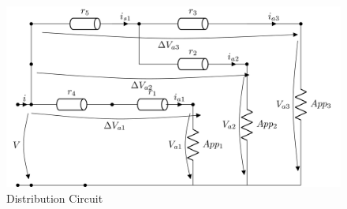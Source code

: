 \begin{figure} 
	\centering
	\includegraphics[width=1\linewidth]{tikz/DistributionCircuit}
	\caption[Distribution Circuit]{Distribution Circuit}
	\label{fig:DistributionCircuit}
	\vspace*{-3ex}
\end{figure}
